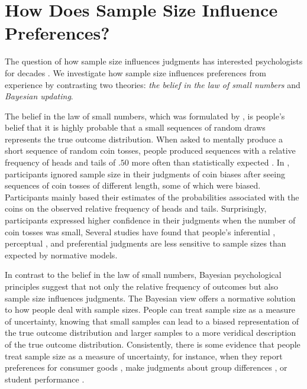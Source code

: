 \documentclass[a4paper, man, natbib, floatsintext]{apa6}
\begin{document}
\section{How Does Sample Size Influence Preferences?}
The question of how sample size influences judgments has interested psychologists for decades \citep[e.g.,][]{Tversky1971, Griffin1992}. We investigate how sample size influences preferences from experience by contrasting two theories: \textit{the belief in the law of small numbers} \citep{Tversky1971} and \textit{Bayesian updating}. 

The belief in the law of small numbers, which was formulated by \cite{Tversky1971}, is people's belief that it is highly probable that a small sequences of random draws represents the true outcome distribution. When asked to mentally produce a short sequence of random coin tosses, people produced sequences with a relative frequency of heads and tails of $.50$ more often than statistically expected \citep{Tversky1971}. In \cite{Griffin1992}, participants ignored sample size in their judgments of coin biases after seeing sequences of coin tosses of different length, some of which were biased. Participants mainly based their estimates of the probabilities associated with the coins on the observed relative frequency of heads and tails. Surprisingly, participants expressed higher confidence in their judgments when the number of coin tosses was small,  Several studies have found that people's inferential \citep[e.g.,][]{Kutzner2016}, perceptual \citep[e.g.,][]{Kvam2016}, and preferential judgments \citep[e.g.,][]{Powell2017} are less sensitive to sample sizes than expected by normative models.

In contrast to the belief in the law of small numbers, Bayesian psychological principles suggest that not only the relative frequency of outcomes but also sample size influences judgments. The Bayesian view offers a normative solution to how people deal with sample sizes. People can treat sample size as a measure of uncertainty, knowing that small samples can lead to a biased representation of the true outcome distribution and larger samples to a more veridical description of the true outcome distribution. Consistently, there is some evidence that people treat sample size as a measure of uncertainty, for instance, when they report preferences for consumer goods \citep{DeMartino2017}, make judgments about group differences \citep{Obrecht2010}, or student performance \citep{Fiedler2002}.
\end{document}
